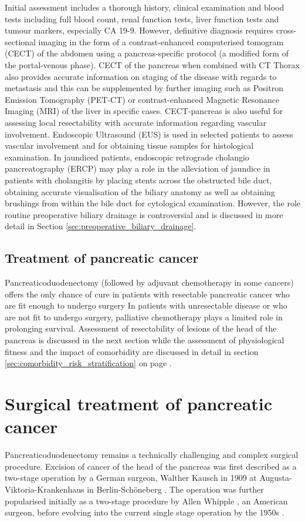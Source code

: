 Initial assessment includes a thorough history, clinical examination and blood tests including full blood count, renal function tests, liver function tests and tumour markers, especially CA 19-9. 
However, definitive diagnosis requires cross-sectional imaging in the form of a contrast-enhanced computerised tomogram (CECT) of the abdomen using a pancreas-specific protocol (a modified form of the portal-venous phase). 
CECT of the pancreas when combined with CT Thorax also provides accurate information on staging of the disease with regards to metastasis and this can be supplemented by further imaging such as Positron Emission Tomography (PET-CT) or contrast-enhanced Magnetic Resonance Imaging (MRI) of the liver in specific cases. 
CECT-pancreas is also useful for assessing local resectability with accurate information regarding vascular involvement. 
Endoscopic Ultrasound (EUS) is used in selected patients to assess vascular involvement and for obtaining tissue samples for histological examination. 
In jaundiced patients, endoscopic retrograde cholangio pancreatography (ERCP) may play a role in the alleviation of jaundice in patients with cholangitis by placing stents across the obstructed bile duct, obtaining accurate visualisation of the biliary anatomy as well as obtaining brushings from within the bile duct for cytological examination. 
However, the role routine preoperative biliary drainage is controversial and is discussed in more detail in Section \ref{sec:preoperative_biliary_drainage}.
	
\subsection{Treatment of pancreatic cancer}
Pancreaticoduodenectomy (followed by adjuvant chemotherapy in some cancers) offers the only chance of cure in patients with resectable pancreatic cancer who are fit enough to undergo surgery \parencite{li_pancreatic_2004}
In patients with unresectable disease or who are not fit to undergo surgery, palliative chemotherapy plays a limited role in prolonging survival. 
Assessment of resectability of lesions of the head of the pancreas is discussed in the next section while the assessment of physiological fitness and the impact of comorbidity are discussed in detail in section \ref{sec:comorbidity_risk_stratification} on page \pageref{sec:comorbidity_risk_stratification}.

\section{Surgical treatment of pancreatic cancer}
Pancreaticoduodenectomy remains a technically challenging and complex surgical procedure. 
Excision of cancer of the head of the pancreas was first described as a two-stage operation by a German surgeon, Walther Kausch in 1909 at Augusta-Viktoria-Krankenhaus in Berlin-Schöneberg \parencite{kausch_carcinom_1912}. 
The operation was further popularised initially as a two-stage procedure by Allen Whipple \parencite{whipple_treatment_1935}, an American surgeon, before evolving into the current single stage operation by the 1950s \parencite{whipple_rationale_1941, whipple_radical_1950}.

